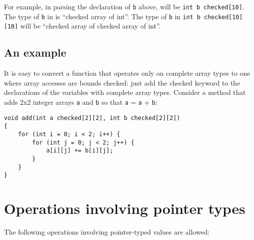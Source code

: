 For example, in parsing the declaration of \texttt{b} above, 
will be \texttt{int b checked[10]}. The type of \texttt{b} in
 is ``checked array of int''. The type of \texttt{b} in
\texttt{int b checked[10][10]} will be ``checked array of
checked array of int''.

\subsection{An example}

It is easy to convert a function that operates only on complete array
types to one where array accesses are bounds checked: just add the
checked keyword to the declarations of the variables with complete array
types. Consider a method that adds 2x2 integer arrays \texttt{a} and
\texttt{b} so that \texttt{a} = \texttt{a} + \texttt{b}:

\begin{verbatim}
void add(int a checked[2][2], int b checked[2][2])
{
    for (int i = 0; i < 2; i++) {
        for (int j = 0; j < 2; j++) {
            a[i][j] += b[i][j];
        }
    }
}
\end{verbatim}

\section{Operations involving pointer types}

The following operations involving pointer-typed values are allowed:

